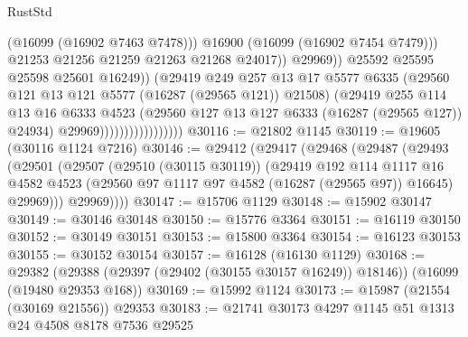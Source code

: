 \begin{lexlean}{RustStd}
\begin{coremodule}
                                                  (@16099 (@16902 @7463 @7478)))
                                                @16900
                                                (@16099 (@16902 @7454 @7479)))
                                              @21253
                                              @21256
                                              @21259
                                              @21263
                                              @21268
                                              @24017))
                                          @29969))
                                      @25592
                                      @25595
                                      @25598
                                      @25601
                                      @16249))
                                  (@29419
                                    @249
                                    @257
                                    @13
                                    @17
                                    @5577
                                    @6335
                                    (@29560 @121 @13 @121 @5577 (@16287 (@29565 @121)) @21508)
                                    (@29419
                                      @255
                                      @114
                                      @13
                                      @16
                                      @6333
                                      @4523
                                      (@29560 @127 @13 @127 @6333 (@16287 (@29565 @127)) @24934)
                                      @29969)))))))))))))))))
@30116 := @21802 @1145
@30119 := @19605 (@30116 @1124 @7216)
@30146 := @29412
    (@29417
      (@29468
        (@29487
          (@29493
            (@29501
              (@29507
                (@29510 (@30115 @30119))
                (@29419
                  @192
                  @114
                  @1117
                  @16
                  @4582
                  @4523
                  (@29560 @97 @1117 @97 @4582 (@16287 (@29565 @97)) @16645)
                  @29969)))
            @29969))))
@30147 := @15706 @1129
@30148 := @15902 @30147
@30149 := @30146 @30148
@30150 := @15776 @3364
@30151 := @16119 @30150
@30152 := @30149 @30151
@30153 := @15800 @3364
@30154 := @16123 @30153
@30155 := @30152 @30154
@30157 := @16128 (@16130 @1129)
@30168 := @29382
    (@29388 (@29397 (@29402 (@30155 @30157 @16249)) @18146))
    (@16099 (@19480 @29353 @168))
@30169 := @15992 @1124
@30173 := @15987 (@21554 (@30169 @21556)) @29353
@30183 := @21741 @30173 @4297 @1145 @51 @1313 @24 @4508 @8178 @7536 @29525

\end{coremodule}
\end{lexlean}

